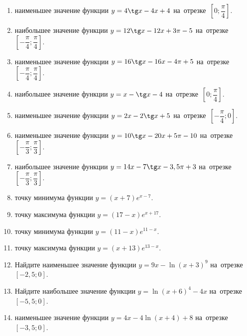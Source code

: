 \documentclass[a4paper,10pt]{article}
\begin{document}
\begin{enumerate}
\item {} наименьшее значение функции $y=4\tg x-4x+4$ на~отрезке~$\left[0;\dfrac{\pi }{4}\right]$.

\item {} наибольшее значение функции $y=12\tg x-12x+3\pi -5$ на~отрезке~$\left[-\dfrac{\pi }{4};\dfrac{\pi }{4}\right]$.

\item {} наименьшее значение функции $y=16\tg x-16x-4\pi +5$ на~отрезке~$\left[-\dfrac{\pi }{4};\dfrac{\pi }{4}\right]$.

\item {} наибольшее значение функции $y=x-\tg x-4$ на~отрезке~$\left[0;\dfrac{\pi }{4}\right]$.

\item {} наименьшее значение функции $y=2x-2\tg x+5$ на~отрезке~$\left[-\dfrac{\pi }{4};0\right]$.

\item {} наименьшее значение функции $y=10\tg x-20x+5\pi -10$ на~отрезке~$\left[-\dfrac{\pi }{3};\dfrac{\pi }{3}\right]$.

\item {} наибольшее значение функции $y=14x-7\tg x-3,5\pi +3$ на~отрезке~$\left[-\dfrac{\pi }{3};\dfrac{\pi }{3}\right]$.

\item {} точку минимума функции $y=\left(x+7\right)e^{x-7}$.

\item {} точку максимума функции $y=\left(17-x\right)e^{x+17}$.

\item {} точку минимума функции $y=\left(11-x\right)e^{11-x}$.

\item {} точку максимума функции $y=\left(x+13\right)e^{13-x}$.

\item Найдите наименьшее значение функции $y=9x-\ln \left(x+3\right)^9$ на~отрезке~$\left[-2,5;0\right]$.

\item Найдите наибольшее значение функции $y=\ln \left(x+6\right)^4-4x$ на~отрезке~$\left[-5,5;0\right]$.

\item {} наименьшее значение функции $y=4x-4\ln \left(x+4\right)+8$ на~отрезке~$\left[-3,5;0\right]$.


\end{enumerate}
\end{document}
